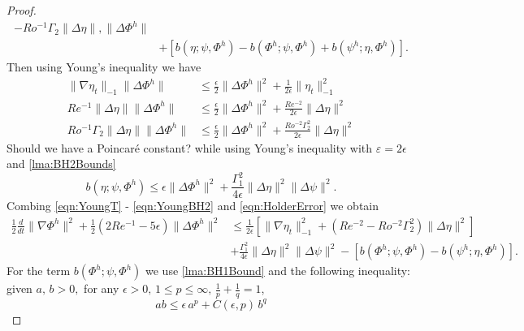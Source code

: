 \begin{proof}
\begin{equation}
\begin{split}
        - Ro^{-1} \Gamma_2 \|\Delta \eta\|, \|\Delta \Phi^h\| \\
      & + \left[ b(\eta;\psi,\Phi^h) - b(\Phi^h;\psi,\Phi^h)
        + b(\psi^h;\eta,\Phi^h)\right].
    \end{split}
    \label{eqn:HolderError}
  \end{equation}
  Then using Young's inequality we have
  \begin{align}
    \|\nabla \eta_t\|_{-1} \|\Delta \Phi^h\|
      &\le \frac{\epsilon}{2} \|\Delta \Phi^h\|^2
      + \frac{1}{2 \epsilon} \|\eta_t\|_{-1}^2 \label{eqn:YoungT} \\
    Re^{-1} \|\Delta \eta\| \|\Delta \Phi^h\|
      &\le \frac{\epsilon}{2} \|\Delta \Phi^h\|^2
      + \frac{Re^{-2}}{2 \epsilon} \|\Delta \eta\|^2 \label{eqn:YoungLaplace} \\
    Ro^{-1} \Gamma_2 \|\Delta \eta\| \|\Delta \Phi^h\|
      &\le \frac{\epsilon}{2} \|\Delta \Phi^h\|^2
      + \frac{Ro^{-2} \Gamma_2^2}{2 \epsilon} \|\Delta \eta\|^2 \label{eqn:YoungBeta}
  \end{align}
  {\color{red} Should we have a Poincar\'e constant?}
  while using Young's inequality with $\varepsilon = 2 \epsilon$ and
  \autoref{lma:BH2Bounds}
  \begin{equation}
    b(\eta;\psi,\Phi^h)
      \le \epsilon \|\Delta \Phi^h\|^2
      + \frac{\Gamma_1^2}{4 \epsilon} \|\Delta \eta\|^2 \|\Delta \psi\|^2.
      \label{eqn:YoungBH2}
  \end{equation}
  Combing \eqref{eqn:YoungT} - \eqref{eqn:YoungBH2} and \eqref{eqn:HolderError}
  we obtain
  \begin{equation}
    \begin{split}
    \frac{1}{2} \frac{d}{dt} \|\nabla \Phi^h\|^2 + \frac{1}{2}\left(2Re^{-1} -
      5 \epsilon \right)\|\Delta \Phi^h\|^2
      &\le \frac{1}{2 \epsilon}\left[\|\nabla \eta_t\|_{-1}^2
      + \left( Re^{-2} - Ro^{-2} \Gamma_2^2 \right) \|\Delta \eta\|^2\right] \\
     & + \frac{\Gamma_1^2}{4 \epsilon}\|\Delta \eta\|^2 \|\Delta \psi\|^2  -
     \left[b(\Phi^h;\psi,\Phi^h) - b(\psi^h;\eta,\Phi^h)\right].
    \end{split}
    \label{eqn:B1Inequality}
  \end{equation}
  For the term $b(\Phi^h; \psi, \Phi^h)$ we use \autoref{lma:BH1Bound} and the
  following inequality: given $a,\,b>0,$ for any $\epsilon > 0,\, 1\le p \le
  \infty,\, \frac{1}{p} + \frac{1}{q} = 1$,
  \begin{equation*}
    ab \le \epsilon\, a^p + C(\epsilon,p)\, b^q

\end{equation*}
\end{proof}
